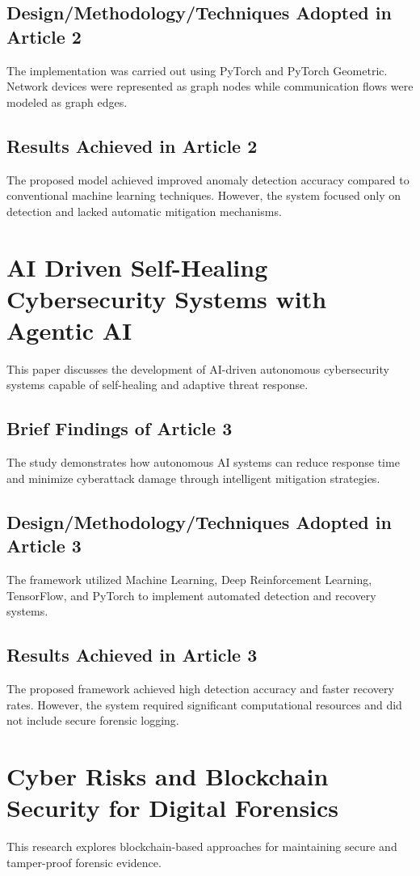 \documentclass[12pt,a4paper]{report}
\begin{document}
\subsection{Design/Methodology/Techniques Adopted in Article 2}
The implementation was carried out using PyTorch and PyTorch Geometric. Network devices were represented as graph nodes while communication flows were modeled as graph edges.

\subsection{Results Achieved in Article 2}
The proposed model achieved improved anomaly detection accuracy compared to conventional machine learning techniques. However, the system focused only on detection and lacked automatic mitigation mechanisms.

\section{AI Driven Self-Healing Cybersecurity Systems with Agentic AI \cite{paper3}}
This paper discusses the development of AI-driven autonomous cybersecurity systems capable of self-healing and adaptive threat response.

\subsection{Brief Findings of Article 3}
The study demonstrates how autonomous AI systems can reduce response time and minimize cyberattack damage through intelligent mitigation strategies.

\subsection{Design/Methodology/Techniques Adopted in Article 3}
The framework utilized Machine Learning, Deep Reinforcement Learning, TensorFlow, and PyTorch to implement automated detection and recovery systems.

\subsection{Results Achieved in Article 3}
The proposed framework achieved high detection accuracy and faster recovery rates. However, the system required significant computational resources and did not include secure forensic logging.

\section{Cyber Risks and Blockchain Security for Digital Forensics \cite{paper4}}
This research explores blockchain-based approaches for maintaining secure and tamper-proof forensic evidence.
\end{document}
